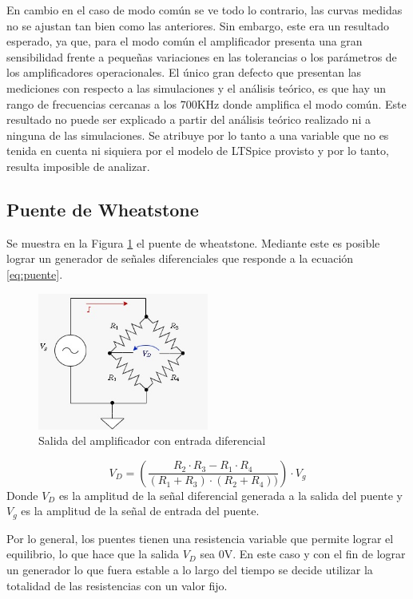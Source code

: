 En cambio en el caso de modo com\'un se ve todo lo contrario, las curvas medidas no se ajustan tan bien como las anteriores. Sin embargo, este era un resultado esperado, ya que, para el modo com\'un el amplificador presenta una gran sensibilidad frente a peque\~nas variaciones en las tolerancias o los par\'ametros de los amplificadores operacionales. 
El \'unico gran defecto que presentan las mediciones con respecto a las simulaciones y el an\'alisis te\'orico, es que hay un rango de frecuencias cercanas a los 700KHz donde amplifica el modo com\'un. Este resultado no puede ser explicado a partir del an\'alisis te\'orico realizado ni a ninguna de las simulaciones. Se atribuye por lo tanto a una variable que no es tenida en cuenta ni siquiera por el modelo de LTSpice provisto y por lo tanto, resulta imposible de analizar.

\subsection{Puente de Wheatstone}
Se muestra en la Figura \ref{fig:puente} el puente de wheatstone. Mediante este es posible lograr un generador de se\~nales diferenciales 
que responde a la ecuaci\'on \ref{eq:puente}.
\begin{figure}[H]

    \centering
    \includegraphics[width=0.5\textwidth]{../EJ3/Recursos/PUENTE}
    \caption{Salida del amplificador con entrada diferencial}
    \label{fig:puente}
\end{figure}
\begin{equation}
    V_D=\left(\frac{R_2 \cdot R_3 - R_1 \cdot R_4}{(R_1 + R_3)\cdot(R_2 + R_4))}\right)\cdot V_g
    \label{eq:puente}
\end{equation}
Donde $V_D$ es la amplitud de la se\~nal diferencial generada a la salida del puente y $V_g$ es la amplitud de la se\~nal de entrada del puente.

Por lo general, los puentes tienen una resistencia variable que permite lograr el equilibrio, lo que hace que la salida $V_D$ sea 0V. En este caso y con el fin de lograr un generador lo que fuera estable a lo largo del tiempo se decide utilizar la totalidad de las resistencias con un valor fijo.

